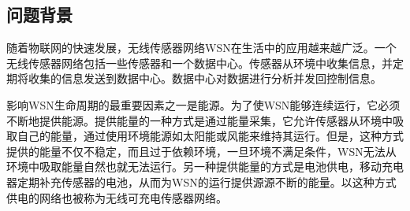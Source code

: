 \documentclass[withoutpreface,bwprint]{cumcmthesis} %
\begin{document}
\subsection{问题背景}
随着物联网的快速发展，无线传感器网络WSN在生活中的应用越来越广泛。一个无线传感器网络包括一些传感器和一个数据中心。传感器从环境中收集信息，并定期将收集的信息发送到数据中心。数据中心对数据进行分析并发回控制信息。\par
影响WSN生命周期的最重要因素之一是能源。为了使WSN能够连续运行，它必须不断地提供能源。提供能量的一种方式是通过能量采集，它允许传感器从环境中吸取自己的能量，通过使用环境能源如太阳能或风能来维持其运行。但是，这种方式提供的能量不仅不稳定，而且过于依赖环境，一旦环境不满足条件，WSN无法从环境中吸取能量自然也就无法运行。另一种提供能量的方式是电池供电，移动充电器定期补充传感器的电池，从而为WSN的运行提供源源不断的能量。以这种方式供电的网络也被称为无线可充电传感器网络。\par
\end{document}
